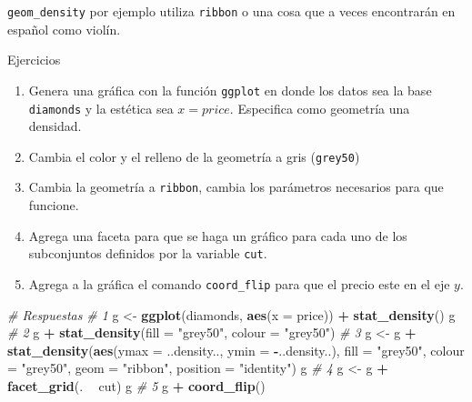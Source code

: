 \documentclass[]{article}
\newenvironment{Shaded}{\begin{snugshade}}{\end{snugshade}}
\newcommand{\KeywordTok}[1]{\textcolor[rgb]{0.13,0.29,0.53}{\textbf{#1}}}
\newcommand{\DataTypeTok}[1]{\textcolor[rgb]{0.13,0.29,0.53}{#1}}
\newcommand{\StringTok}[1]{\textcolor[rgb]{0.31,0.60,0.02}{#1}}
\newcommand{\CommentTok}[1]{\textcolor[rgb]{0.56,0.35,0.01}{\textit{#1}}}
\newcommand{\OperatorTok}[1]{\textcolor[rgb]{0.81,0.36,0.00}{\textbf{#1}}}
\newcommand{\NormalTok}[1]{#1}
\begin{document}
\texttt{geom\_density} por ejemplo utiliza \texttt{ribbon} o una cosa
que a veces encontrarán en español como violín.

\renewcommand\bcStyleTitre[1]{\large\textcolor{bbblack}{#1}}

\begin{bclogo}[
  couleur=llred,
  arrondi=0,
  logo=\bcstop,
  barre=none,
  noborder=true]{Ejercicios}
\begin{enumerate}
\item Genera una gráfica con la función \texttt{ggplot} en donde los datos sea
la base \texttt{diamonds} y la estética sea $x = price$. Especifica como geometría
una densidad.
\item Cambia el color y el relleno de la geometría a gris (\texttt{grey50})
\item Cambia la geometría a \texttt{ribbon}, cambia los parámetros necesarios
para que funcione.
\item Agrega una faceta para que se haga un gráfico para cada uno de los subconjuntos
definidos por la variable \texttt{cut}.
\item Agrega a la gráfica el comando \texttt{coord\_flip} para que el precio este
en el eje $y$.
\end{enumerate}

\end{bclogo}

\begin{Shaded}
\begin{Highlighting}[]
\CommentTok{# Respuestas}
\CommentTok{# 1}
\NormalTok{g <-}\StringTok{ }\KeywordTok{ggplot}\NormalTok{(diamonds, }\KeywordTok{aes}\NormalTok{(}\DataTypeTok{x =}\NormalTok{ price)) }\OperatorTok{+}\StringTok{ }\KeywordTok{stat_density}\NormalTok{()}
\NormalTok{g}
\CommentTok{# 2}
\NormalTok{g }\OperatorTok{+}
\StringTok{  }\KeywordTok{stat_density}\NormalTok{(}\DataTypeTok{fill =} \StringTok{"grey50"}\NormalTok{, }\DataTypeTok{colour =} \StringTok{"grey50"}\NormalTok{) }
\CommentTok{# 3}
\NormalTok{g <-}\StringTok{ }\NormalTok{g }\OperatorTok{+}
\StringTok{  }\KeywordTok{stat_density}\NormalTok{(}\KeywordTok{aes}\NormalTok{(}\DataTypeTok{ymax =}\NormalTok{ ..density..,  }\DataTypeTok{ymin =} \OperatorTok{-}\NormalTok{..density..),}
    \DataTypeTok{fill =} \StringTok{"grey50"}\NormalTok{, }\DataTypeTok{colour =} \StringTok{"grey50"}\NormalTok{,}
    \DataTypeTok{geom =} \StringTok{"ribbon"}\NormalTok{, }\DataTypeTok{position =} \StringTok{"identity"}\NormalTok{)}
\NormalTok{g}
\CommentTok{# 4}
\NormalTok{g <-}\StringTok{ }\NormalTok{g  }\OperatorTok{+}
\StringTok{  }\KeywordTok{facet_grid}\NormalTok{(. }\OperatorTok{~}\StringTok{ }\NormalTok{cut) }
\NormalTok{g}
\CommentTok{# 5}
\NormalTok{g }\OperatorTok{+}\StringTok{ }\KeywordTok{coord_flip}\NormalTok{()}
\end{Highlighting}
\end{Shaded}
\end{document}
